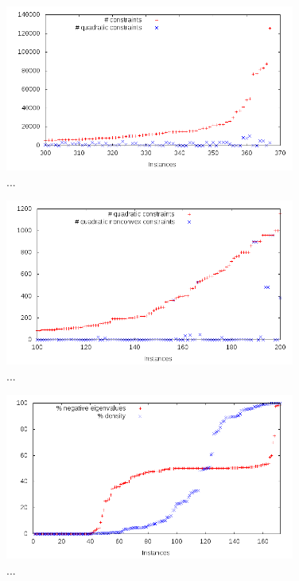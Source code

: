 \begin{figure}\centering
  \includegraphics[width=0.85\textwidth]{pic_constr_big.png}
  \caption{...\label{fig:7}}
\end{figure}

\begin{figure}\centering
  \includegraphics[width=0.85\textwidth]{pic_quad_vs_convex_constr.png}
  \caption{...\label{fig:8}}
\end{figure}


\begin{figure}\centering
  \includegraphics[width=0.85\textwidth]{pic_fuffa.png}
  \caption{...\label{fig:9}}
\end{figure}

